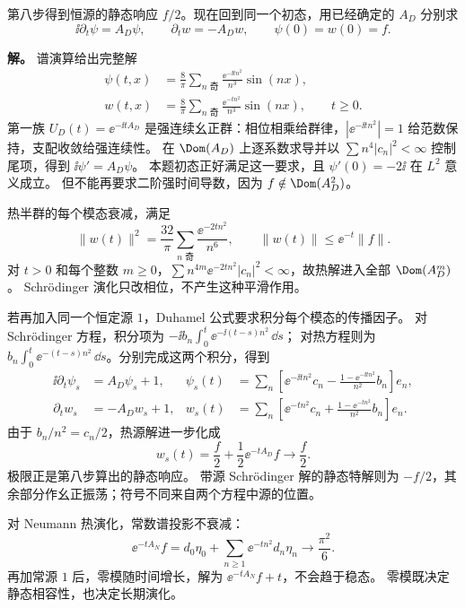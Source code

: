 \begin{exbox}
第八步得到恒源的静态响应 $f/2$。现在回到同一个初态，用已经确定的 $A_D$ 分别求
\[
 \ii\partial_t\psi=A_D\psi,\qquad
 \partial_t w=-A_Dw,
 \qquad \psi(0)=w(0)=f.
\]

\textbf{解。} 谱演算给出完整解
\begin{align*}
 \psi(t,x)&=\frac8\pi\sum_{n\text{ 奇}}\frac{\ee^{-\ii tn^2}}{n^3}\sin(nx),\\
 w(t,x)&=\frac8\pi\sum_{n\text{ 奇}}\frac{\ee^{-tn^2}}{n^3}\sin(nx),\qquad t\ge0.
\end{align*}
第一族 $U_D(t)=\ee^{-\ii tA_D}$ 是强连续幺正群：相位相乘给群律，$|\ee^{-\ii tn^2}|=1$ 给范数保持，支配收敛给强连续性。
在 $\Dom(A_D)$ 上逐系数求导并以 $\sum n^4|c_n|^2<\infty$ 控制尾项，得到 $\ii\psi'=A_D\psi$。
本题初态正好满足这一要求，且 $\psi'(0)=-2\ii$ 在 $L^2$ 意义成立。
但不能再要求二阶强时间导数，因为 $f\notin\Dom(A_D^2)$。

热半群的每个模态衰减，满足
\[
 \|w(t)\|^2=\frac{32}\pi\sum_{n\text{ 奇}}\frac{\ee^{-2tn^2}}{n^6},
 \qquad \|w(t)\|\le \ee^{-t}\|f\|.
\]
对 $t>0$ 和每个整数 $m\ge0$，$\sum n^{4m}\ee^{-2tn^2}|c_n|^2<\infty$，故热解进入全部 $\Dom(A_D^m)$。
Schr\"odinger 演化只改相位，不产生这种平滑作用。

若再加入同一个恒定源 $1$，Duhamel 公式要求积分每个模态的传播因子。
对 Schr\"odinger 方程，积分项为 $-\ii b_n\int_0^t \ee^{-\ii(t-s)n^2}\,\dd s$；
对热方程则为 $b_n\int_0^t \ee^{-(t-s)n^2}\,\dd s$。分别完成这两个积分，得到
\begin{align*}
 \ii\partial_t\psi_s&=A_D\psi_s+1,&
 \psi_s(t)&=\sum_n\left[\ee^{-\ii tn^2}c_n
 -\frac{1-\ee^{-\ii tn^2}}{n^2}b_n\right]e_n,\\
 \partial_t w_s&=-A_Dw_s+1,&
 w_s(t)&=\sum_n\left[\ee^{-tn^2}c_n
 +\frac{1-\ee^{-tn^2}}{n^2}b_n\right]e_n.
\end{align*}
由于 $b_n/n^2=c_n/2$，热源解进一步化成
\[
 w_s(t)=\frac f2+\frac12\ee^{-tA_D}f\longrightarrow\frac f2.
\]
极限正是第八步算出的静态响应。
带源 Schr\"odinger 解的静态特解则为 $-f/2$，其余部分作幺正振荡；符号不同来自两个方程中源的位置。

对 Neumann 热演化，常数谱投影不衰减：
\[
 \ee^{-tA_N}f=d_0\eta_0+\sum_{n\ge1}\ee^{-tn^2}d_n\eta_n
 \longrightarrow\frac{\pi^2}{6}.
\]
再加常源 $1$ 后，零模随时间增长，解为 $\ee^{-tA_N}f+t$，不会趋于稳态。
零模既决定静态相容性，也决定长期演化。
\end{exbox}

